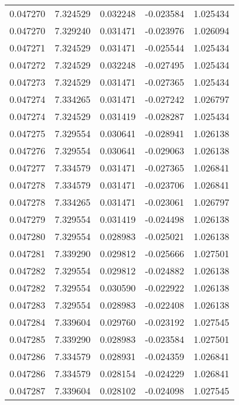 \begin{tabular}{lrrrr}
0.047270    &  7.324529 &  0.032248 & -0.023584 &             1.025434 \\
0.047270    &  7.329240 &  0.031471 & -0.023976 &             1.026094 \\
0.047271    &  7.324529 &  0.031471 & -0.025544 &             1.025434 \\
0.047272    &  7.324529 &  0.032248 & -0.027495 &             1.025434 \\
0.047273    &  7.324529 &  0.031471 & -0.027365 &             1.025434 \\
0.047274    &  7.334265 &  0.031471 & -0.027242 &             1.026797 \\
0.047274    &  7.324529 &  0.031419 & -0.028287 &             1.025434 \\
0.047275    &  7.329554 &  0.030641 & -0.028941 &             1.026138 \\
0.047276    &  7.329554 &  0.030641 & -0.029063 &             1.026138 \\
0.047277    &  7.334579 &  0.031471 & -0.027365 &             1.026841 \\
0.047278    &  7.334579 &  0.031471 & -0.023706 &             1.026841 \\
0.047278    &  7.334265 &  0.031471 & -0.023061 &             1.026797 \\
0.047279    &  7.329554 &  0.031419 & -0.024498 &             1.026138 \\
0.047280    &  7.329554 &  0.028983 & -0.025021 &             1.026138 \\
0.047281    &  7.339290 &  0.029812 & -0.025666 &             1.027501 \\
0.047282    &  7.329554 &  0.029812 & -0.024882 &             1.026138 \\
0.047282    &  7.329554 &  0.030590 & -0.022922 &             1.026138 \\
0.047283    &  7.329554 &  0.028983 & -0.022408 &             1.026138 \\
0.047284    &  7.339604 &  0.029760 & -0.023192 &             1.027545 \\
0.047285    &  7.339290 &  0.028983 & -0.023584 &             1.027501 \\
0.047286    &  7.334579 &  0.028931 & -0.024359 &             1.026841 \\
0.047286    &  7.334579 &  0.028154 & -0.024229 &             1.026841 \\
0.047287    &  7.339604 &  0.028102 & -0.024098 &             1.027545 \\

\end{tabular}
